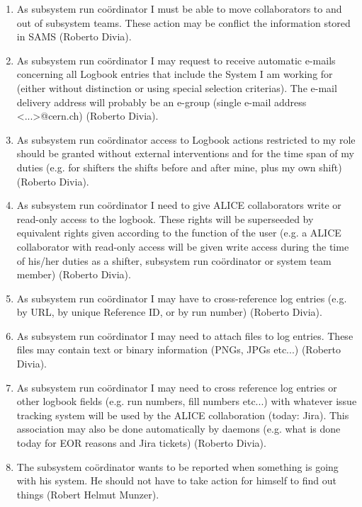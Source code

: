 \begin{enumerate}
  \item As subsystem run co\"ordinator I must be able to move collaborators to and out of subsystem teams. These action may be conflict the information stored in SAMS (Roberto Divia).
  \item As subsystem run co\"ordinator I may request to receive automatic e-mails concerning all Logbook entries that include the System I am working for (either without distinction or using special selection criterias). The e-mail delivery address will probably be an e-group (single e-mail address <...>@cern.ch) (Roberto Divia).
  \item As subsystem run co\"ordinator access to Logbook actions restricted to my role should be granted without external interventions and for the time span of my duties (e.g. for shifters the shifts before and after mine, plus my own shift) (Roberto Divia).
  \item As subsystem run co\"ordinator I need to give ALICE collaborators write or read-only access to the logbook. These rights will be superseeded by equivalent rights given according to the function of the user (e.g. a ALICE collaborator with read-only access will be given write access during the time of his/her duties as a shifter, subsystem run co\"ordinator or system team member) (Roberto Divia).
  \item As subsystem run co\"ordinator I may have to cross-reference log entries (e.g. by URL, by unique Reference ID, or by run number)  (Roberto Divia).
  \item  As subsystem run co\"ordinator I may need to attach files to log entries. These files may contain text or binary information (PNGs, JPGs etc...) (Roberto Divia).
  \item As subsystem run co\"ordinator I may need to cross reference log entries or other logbook fields (e.g. run numbers, fill numbers etc...) with whatever issue tracking system will be used by the ALICE collaboration (today: Jira). This association may also be done automatically by daemons (e.g. what is done today for EOR reasons and Jira tickets) (Roberto Divia).
  \item The subsystem co\"ordinator wants to be reported when something is going with his system. He should not have to take action for himself to find out things (Robert Helmut Munzer).
\end{enumerate}

